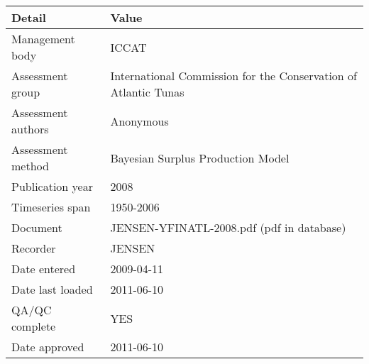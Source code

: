 \begin{table}[htb]
\centering
\begin{tabular}{lp{7cm}}
\toprule
Detail & Value \\
\midrule
Management body    & ICCAT                                                           \\
Assessment group   & International Commission for the Conservation of Atlantic Tunas \\
Assessment authors & Anonymous                                                       \\
Assessment method  & Bayesian Surplus Production Model                               \\
Publication year   & 2008                                                            \\
Timeseries span    & 1950-2006                                                       \\
Document           & JENSEN-YFINATL-2008.pdf (pdf in database)                       \\
Recorder           & JENSEN                                                          \\
Date entered       & 2009-04-11                                                      \\
Date last loaded   & 2011-06-10                                                      \\
QA/QC complete     & YES                                                             \\
Date approved      & 2011-06-10                                                      \\
\bottomrule
\end{tabular}
\label{tab:assessdet}
\end{table}
